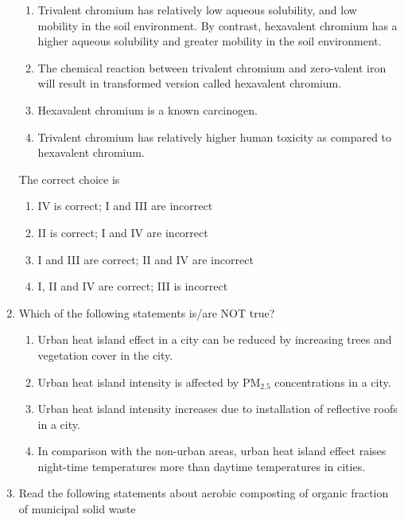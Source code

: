 \documentclass[journal,12pt,onecolumn]{IEEEtran}
\theoremstyle{remark}
\begin{document}
\begin{enumerate}
\begin{enumerate}[label=\Roman*.]
\item Trivalent chromium has relatively low aqueous solubility, and low mobility in the soil environment. By contrast, hexavalent chromium has a higher aqueous solubility and greater mobility in the soil environment.
\item The chemical reaction between trivalent chromium and zero-valent iron will result in transformed version called hexavalent chromium.
\item Hexavalent chromium is a known carcinogen.
\item Trivalent chromium has relatively higher human toxicity as compared to hexavalent chromium.
\end{enumerate}

The correct choice is

\begin{enumerate}
\item IV is correct; I and III are incorrect
\item II is correct; I and IV are incorrect
\item I and III are correct; II and IV are incorrect
\item I, II and IV are correct; III is incorrect
\end{enumerate}
\hfill{}

\newpage

\item Which of the following statements is/are NOT true?

\begin{enumerate}
\item Urban heat island effect in a city can be reduced by increasing trees and vegetation cover in the city.
\item Urban heat island intensity is affected by PM$_{2.5}$ concentrations in a city.
\item Urban heat island intensity increases due to installation of reflective roofs in a city.
\item In comparison with the non-urban areas, urban heat island effect raises night-time temperatures more than daytime temperatures in cities.
\end{enumerate}
\hfill{}
\item Read the following statements about aerobic composting of organic fraction of municipal solid waste


\end{enumerate}
\end{document}
